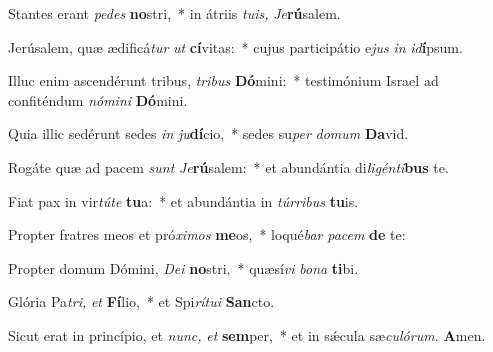 \item Stantes erant \textit{pedes} \textbf{no}stri,~* in átriis \textit{tuis,} \hspace{0.02em}\textit{Je}\textbf{rú}salem.
\item Jerúsalem, quæ ædificá\textit{tur} \textit{ut} \textbf{cí}vitas:~* cujus participátio e\textit{jus} \textit{in} \textit{id}\textbf{í}psum.
\item Illuc enim ascendérunt tribus, \textit{tribus} \textbf{Dó}mini:~* testimónium Israel ad confiténdum \textit{nómini} \textbf{Dó}mini.
\item Quia illic sedérunt sedes \textit{in} \textit{ju}\textbf{dí}cio,~* sedes su\textit{per} \textit{domum} \textbf{Da}vid.
\item Rogáte quæ ad pacem \textit{sunt} \textit{Je}\textbf{rú}salem:~* et abundántia di\textit{ligénti}\textbf{bus} te.
\item Fiat pax in vir\textit{túte} \textbf{tu}a:~* et abundántia in \textit{túrribus} \textbf{tu}is.
\item Propter fratres meos et pró\textit{ximos} \textbf{me}os,~* loqué\hspace{0.01em}\textit{bar} \textit{pacem} \textbf{de} te:
\item Propter domum Dómini, \textit{Dei} \textbf{no}stri,~* quæsí\textit{vi} \textit{bona} \textbf{ti}bi.
\item Glória Pa\tinyhspace\textit{tri,} \textit{et} \textbf{Fí}lio,~* et Spi\textit{rítui} \textbf{San}cto.
\item Sicut erat in princípio, et \textit{nunc,} \textit{et} \textbf{sem}per,~* et in sǽcula sæ\textit{culórum.} \textbf{A}men.